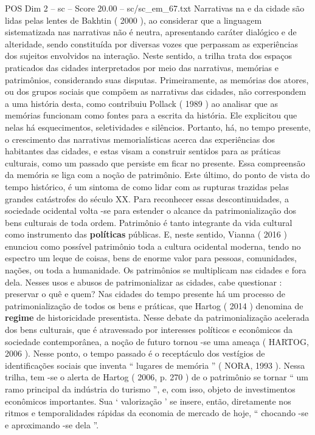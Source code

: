 \begin{textsample}{POS Dim 2 – sc – Score 20.00 – sc/sc\_em\_67.txt}
Narrativas na e da cidade são lidas pelas lentes de Bakhtin ( 2000 ), ao considerar que a linguagem sistematizada nas narrativas não é neutra, apresentando caráter dialógico e de alteridade, sendo constituída por diversas vozes que perpassam as experiências dos sujeitos envolvidos na interação.
Neste sentido, a trilha trata dos espaços praticados das cidades interpretados por meio das narrativas, memórias e patrimônios, considerando suas disputas.
Primeiramente, as memórias dos atores, ou dos grupos sociais que compõem as narrativas das cidades, não correspondem a uma história desta, como contribuiu Pollack ( 1989 ) ao analisar que as memórias funcionam como fontes para a escrita da história.
Ele explicitou que nelas há esquecimentos, seletividades e silêncios.
Portanto, há, no tempo presente, o crescimento das narrativas memorialísticas acerca das experiências dos habitantes das cidades, e estas visam a construir sentidos para as práticas culturais, como um passado que persiste em ficar no presente.
Essa compreensão da memória se liga com a noção de patrimônio.
Este último, do ponto de vista do tempo histórico, é um sintoma de como lidar com as rupturas trazidas pelas grandes catástrofes do século XX.
Para reconhecer essas descontinuidades, a sociedade ocidental volta -se para estender o alcance da patrimonialização dos bens culturais de toda ordem.
Patrimônio é tanto integrante da vida cultural como instrumento das \textbf{políticas} públicas.
E, neste sentido, Vianna ( 2016 ) enunciou como possível patrimônio toda a cultura ocidental moderna, tendo no espectro um leque de coisas, bens de enorme valor para pessoas, comunidades, nações, ou toda a humanidade.
Os patrimônios se multiplicam nas cidades e fora dela.
Nesses usos e abusos de patrimonializar as cidades, cabe questionar : preservar o quê e quem?
Nas cidades do tempo presente há um processo de patrimonialização de todos os bens e práticas, que Hartog ( 2014 ) denomina de \textbf{regime} de historicidade presentista.
Nesse debate da patrimonialização acelerada dos bens culturais, que é atravessado por interesses políticos e econômicos da sociedade contemporânea, a noção de futuro tornou -se uma ameaça ( HARTOG, 2006 ).
Nesse ponto, o tempo passado é o receptáculo dos vestígios de identificações sociais que inventa “ lugares de memória ” ( NORA, 1993 ).
Nessa trilha, tem -se o alerta de Hartog ( 2006, p. 270 ) de o patrimônio se tornar “ um ramo principal da indústria do turismo ”, e, com isso, objeto de investimentos econômicos importantes.
Sua ‘ valorização ’ se insere, então, diretamente nos ritmos e temporalidades rápidas da economia de mercado de hoje, “ chocando -se e aproximando -se dela ”.

\end{textsample}
